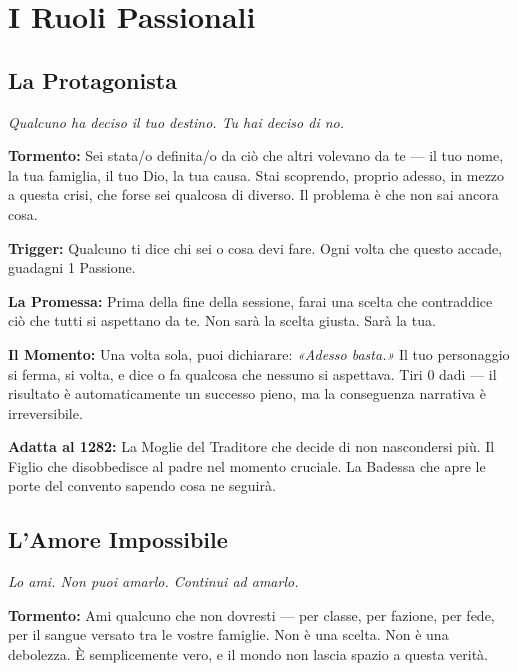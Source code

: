 
\secsep

\section{I Ruoli Passionali}

\subsection{La Protagonista}
\textit{Qualcuno ha deciso il tuo destino. Tu hai deciso di no.}

\textbf{Tormento:} Sei stata/o definita/o da ciò che altri volevano da te
— il tuo nome, la tua famiglia, il tuo Dio, la tua causa. Stai scoprendo,
proprio adesso, in mezzo a questa crisi, che forse sei qualcosa di diverso.
Il problema è che non sai ancora cosa.

\textbf{Trigger:} Qualcuno ti dice chi sei o cosa devi fare. Ogni volta
che questo accade, guadagni 1 Passione.

\textbf{La Promessa:} Prima della fine della sessione, farai una scelta
che contraddice ciò che tutti si aspettano da te. Non sarà la scelta
giusta. Sarà la tua.

\textbf{Il Momento:} Una volta sola, puoi dichiarare: \textit{«Adesso
basta.»} Il tuo personaggio si ferma, si volta, e dice o fa qualcosa che
nessuno si aspettava. Tiri 0 dadi — il risultato è automaticamente un
successo pieno, ma la conseguenza narrativa è irreversibile.

\textbf{Adatta al 1282:} La Moglie del Traditore che decide di non
nascondersi più. Il Figlio che disobbedisce al padre nel momento
cruciale. La Badessa che apre le porte del convento sapendo cosa
ne seguirà.

\filetto

\subsection{L'Amore Impossibile}
\textit{Lo ami. Non puoi amarlo. Continui ad amarlo.}

\textbf{Tormento:} Ami qualcuno che non dovresti — per classe, per fazione,
per fede, per il sangue versato tra le vostre famiglie. Non è una
scelta. Non è una debolezza. È semplicemente vero, e il mondo non
lascia spazio a questa verità.

